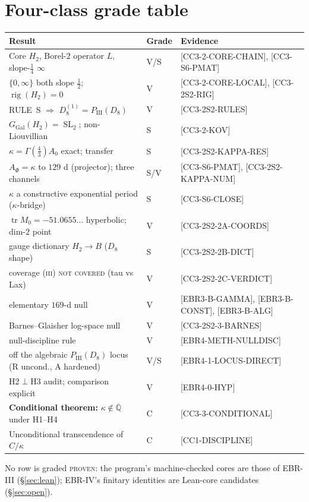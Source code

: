 \documentclass[11pt,reqno]{amsart}
\theoremstyle{plain}
\theoremstyle{definition}
\theoremstyle{remark}
\newcommand{\Q}{\mathbb{Q}}
\newcommand{\Qbar}{\overline{\Q}}
\newcommand{\GGal}{G_{\mathrm{Gal}}}
\newcommand{\SL}{\operatorname{SL}}
\newcommand{\tr}{\operatorname{tr}}
\DeclareMathOperator{\rig}{rig}
\newcommand{\Htwo}{H_{2}}
\newcommand{\claim}[1]{\textsf{\small[#1]}}
\newcommand{\PIII}{P_{\mathrm{III}}}
\begin{document}
\section{Four-class grade table}\label{sec:gradetable}

\begin{center}
\small
\begin{tabular}{@{}p{}l>{\raggedright\arraybackslash}p{}@{}}
\toprule
Result & Grade & Evidence \\
\midrule
Core $\Htwo$, Borel-$2$ operator $L$, slope-$\tfrac14$ $\infty$ & V/S &
\claim{CC3-2-CORE-CHAIN}, \claim{CC3-S6-PMAT} \\
$\{0,\infty\}$ both slope $\tfrac12$; $\rig(\Htwo)=0$ & V & \claim{CC3-2-CORE-LOCAL},
\claim{CC3-2S2-RIG} \\
RULE~S $\Rightarrow$ $D_{8}^{(1)}=\PIII(D_{8})$ & V & \claim{CC3-2S2-RULES} \\
$\GGal(\Htwo)=\SL_{2}$; non-Liouvillian & S & \claim{CC3-2-KOV} \\
$\kappa=\Gamma(\tfrac43)A_{0}$ exact; transfer & S & \claim{CC3-2S2-KAPPA-RES} \\
$A_{\Phi}=\kappa$ to $129$ d (projector); three channels & S/V &
\claim{CC3-S6-PMAT}, \claim{CC3-2S2-KAPPA-NUM} \\
$\kappa$ a constructive exponential period ($\kappa$-bridge) & S &
\claim{CC3-S6-CLOSE} \\
$\tr M_{0}=-51.0655\ldots$ hyperbolic; dim-$2$ point & V & \claim{CC3-2S2-2A-COORDS} \\
gauge dictionary $\Htwo\to B$ ($D_{8}$ shape) & S & \claim{CC3-2S2-2B-DICT} \\
coverage \textsc{(iii) not covered} (tau vs Lax) & V & \claim{CC3-2S2-2C-VERDICT} \\
elementary $169$-d null & V & \claim{EBR3-B-GAMMA}, \claim{EBR3-B-CONST},
\claim{EBR3-B-ALG} \\
Barnes--Glaisher log-space null & V & \claim{CC3-2S2-3-BARNES} \\
null-discipline rule & V & \claim{EBR4-METH-NULLDISC} \\
off the algebraic $\PIII(D_{8})$ locus (R uncond., A hardened) & V/S &
\claim{EBR4-1-LOCUS-DIRECT} \\
H2$\perp$H3 audit; comparison explicit & V & \claim{EBR4-0-HYP} \\
\textbf{Conditional theorem:} $\kappa\notin\Qbar$ under H1--H4 & C &
\claim{CC3-3-CONDITIONAL} \\
Unconditional transcendence of $C/\kappa$ & C & \claim{CC1-DISCIPLINE} \\
\bottomrule
\end{tabular}
\end{center}
No row is graded \textsc{proven}: the program's machine-checked cores are those
of EBR-III (\S\ref{sec:lean}); EBR-IV's finitary identities are Lean-core
candidates (\S\ref{sec:open}).
\end{document}
